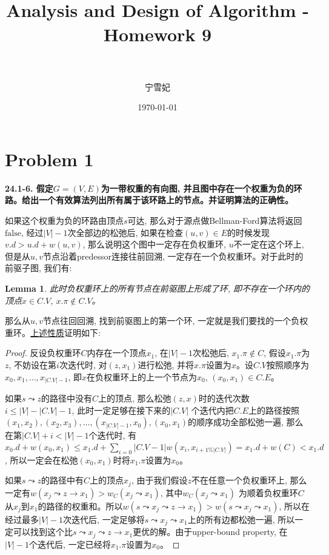 \documentclass[paper=a4, fontsize=11pt]{scrartcl} %
\title{	
\normalfont \normalsize 
\horrule{0.5pt} \\[0.4cm] %
\huge Analysis and Design of Algorithm - Homework 9\\ %
\horrule{2pt} \\[0.5cm] %
}
\author{宁雪妃} %
\date{\normalsize\today} %
\numberwithin{equation}{section} %
\numberwithin{figure}{section} %
\numberwithin{table}{section} %
\newtheorem{lemma}[theorem]{Lemma}
\begin{document}
\maketitle %

\section{Problem 1}
\textbf{24.1-6. 假定$G = (V, E)$为一带权重的有向图, 并且图中存在一个权重为负的环路。给出一个有效算法列出所有属于该环路上的节点。并证明算法的正确性。}

如果这个权重为负的环路由顶点$s$可达, 那么对于源点做Bellman-Ford算法将返回$\mbox{false}$, 经过$|V| - 1$次全部边的松弛后, 如果在检查$(u, v) \in E$的时候发现$v.d > u.d + w(u, v)$, 那么说明这个图中一定存在负权重环, $u$不一定在这个环上, 但是从$u, v$节点沿着predessor连接往前回溯, 一定存在一个负权重环。对于此时的前驱子图, 我们有:

\begin{lemma}
  \label{lemma:1}
  此时负权重环上的所有节点在前驱图上形成了环, 即不存在一个环内的顶点$x \in C.V$, $x.\pi \notin C.V$。
\end{lemma}

那么从$u, v$节点往回回溯, 找到前驱图上的第一个环, 一定就是我们要找的一个负权重环。\hyperref[lemma:1]{上述性质}证明如下:

\begin{proof}
  反设负权重环$C$内存在一个顶点$x_1$, 在$|V| - 1$次松弛后, $x_1.\pi \notin C$, 假设$x_1.\pi$为$z$, 不妨设在第$i$次迭代时, 对$(z, x_1)$进行松弛, 并将$x.\pi$设置为$x$。设$C.V$按照顺序为$x_0, x_1, \dots, x_{|C.V|-1}$, 即$x$在负权重环上的上一个节点为$x_0$, $(x_0, x_1) \in C.E$。

  如果$s \leadsto z$的路径中没有$C$上的顶点, 那么松弛$(z, x)$时的迭代次数$i \leq |V| - |C.V| - 1$, 此时一定足够在接下来的$|C.V| $ 个迭代内把$C.E$上的路径按照$(x_1, x_2), (x_2, x_3), \dots, (x_{|C.V|-1}, x_0), (x_0, x_1)$的顺序成功全部松弛一遍, 那么在第$|C.V| + i < |V| - 1$个迭代时, 有$x_0.d + w(x_0, x_1) \leq x_1.d + \sum_{i=0}{|C.V-1|} w(x_i, x_{i+1 \% |C.V|}) = x_1.d + w(C) < x_1.d$, 所以一定会在松弛$(x_0, x_1)$时将$x_1.\pi$设置为$x_0$。

  如果$s \leadsto z$的路径中有$C$上的顶点$x_j$, 由于我们假设$z$不在任意一个负权重环上, 那么一定有$w(x_j \leadsto z \rightarrow x_1) > w_C(x_j \leadsto x_1)$, 其中$w_C(x_j \leadsto x_1)$ 为顺着负权重环$C$从$x_j$到$x_1$的路径的权重和。所以$w(s \leadsto x_j \leadsto z \rightarrow x_1) > w(s \leadsto x_j \leadsto x_1)$, 所以在经过最多$|V| - 1$次迭代后, 一定足够将$s \leadsto x_j \leadsto x_1$上的所有边都松弛一遍, 所以一定可以找到这个比$s \leadsto x_j \leadsto z \rightarrow x_1$更优的解。由于upper-bound property, 在$|V| - 1$个迭代后, 一定已经将$x_1.\pi$设置为$x_0$。
\end{proof}
\end{document}

